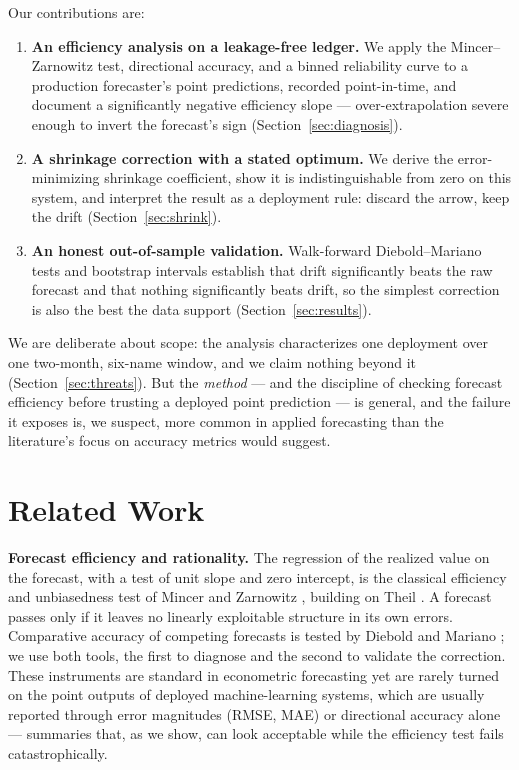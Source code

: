 \documentclass[10pt,twocolumn,twoside]{eec_style}
\newcommand{\refsec}[1]{Section~\ref{sec:#1}}
\begin{document}
Our contributions are:
\begin{enumerate}
\item \textbf{An efficiency analysis on a leakage-free ledger.} We apply the
Mincer--Zarnowitz test, directional accuracy, and a binned reliability curve to a
production forecaster's point predictions, recorded point-in-time, and document a
significantly negative efficiency slope --- over-extrapolation severe enough to invert
the forecast's sign (\refsec{diagnosis}).
\item \textbf{A shrinkage correction with a stated optimum.} We derive the
error-minimizing shrinkage coefficient, show it is indistinguishable from zero on this
system, and interpret the result as a deployment rule: discard the arrow, keep the
drift (\refsec{shrink}).
\item \textbf{An honest out-of-sample validation.} Walk-forward Diebold--Mariano tests
and bootstrap intervals establish that drift significantly beats the raw forecast and
that nothing significantly beats drift, so the simplest correction is also the best the
data support (\refsec{results}).
\end{enumerate}
We are deliberate about scope: the analysis characterizes one deployment over one
two-month, six-name window, and we claim nothing beyond it (\refsec{threats}). But the
\emph{method} --- and the discipline of checking forecast efficiency before trusting a
deployed point prediction --- is general, and the failure it exposes is, we suspect,
more common in applied forecasting than the literature's focus on accuracy metrics
would suggest.

\section{Related Work}
\label{sec:related}
\textbf{Forecast efficiency and rationality.} The regression of the realized value on
the forecast, with a test of unit slope and zero intercept, is the classical efficiency
and unbiasedness test of Mincer and Zarnowitz \cite{mincer1969}, building on Theil
\cite{theil1966}. A forecast passes only if it leaves no linearly exploitable structure
in its own errors. Comparative accuracy of competing forecasts is tested by Diebold and
Mariano \cite{diebold1995}; we use both tools, the first to diagnose and the second to
validate the correction. These instruments are standard in econometric forecasting yet are
rarely turned on the point outputs of deployed machine-learning systems, which are
usually reported through error magnitudes (RMSE, MAE) or directional accuracy alone ---
summaries that, as we show, can look acceptable while the efficiency test fails
catastrophically.
\end{document}
